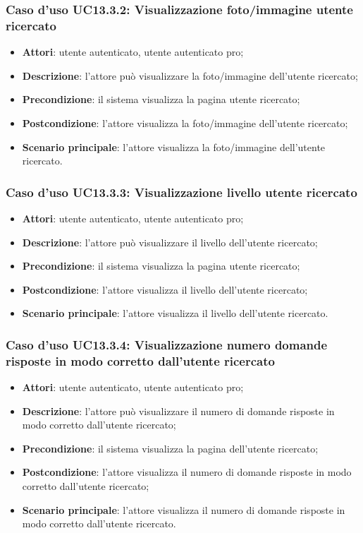 \subsubsection{Caso d'uso UC13.3.2: Visualizzazione foto/immagine utente ricercato}
\begin{itemize}
	\item\textbf{Attori}: utente autenticato, utente autenticato pro;
	\item\textbf{Descrizione}: l'attore può visualizzare la foto/immagine dell'utente ricercato;
	\item\textbf{Precondizione}: il sistema visualizza la pagina utente ricercato;
	\item\textbf{Postcondizione}: l'attore visualizza la foto/immagine dell'utente ricercato;
	\item\textbf{Scenario principale}: l'attore visualizza la foto/immagine dell'utente ricercato.
\end{itemize}

\subsubsection{Caso d'uso UC13.3.3: Visualizzazione livello utente ricercato}
\begin{itemize}
	\item\textbf{Attori}: utente autenticato, utente autenticato pro;
	\item\textbf{Descrizione}: l'attore può visualizzare il livello dell'utente ricercato;
	\item\textbf{Precondizione}: il sistema visualizza la pagina utente ricercato;
	\item\textbf{Postcondizione}: l'attore visualizza il livello dell'utente ricercato;
	\item\textbf{Scenario principale}: l'attore visualizza il livello dell'utente ricercato.
\end{itemize}

\subsubsection{Caso d'uso UC13.3.4: Visualizzazione numero domande risposte in modo corretto dall'utente ricercato}
\begin{itemize}
	\item\textbf{Attori}: utente autenticato, utente autenticato pro;
	\item\textbf{Descrizione}: l'attore può visualizzare il numero di domande risposte in modo corretto dall'utente ricercato;
	\item\textbf{Precondizione}: il sistema visualizza la pagina dell'utente ricercato;
	\item\textbf{Postcondizione}: l'attore visualizza il numero di domande risposte in modo corretto dall'utente ricercato;
	\item\textbf{Scenario principale}: l'attore visualizza il numero di domande risposte in modo corretto dall'utente ricercato.
\end{itemize}

